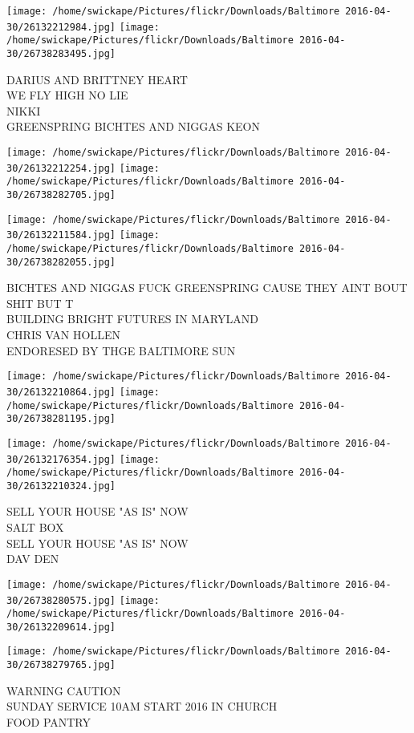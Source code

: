 \documentclass[10pt,letterpaper]{article}
\begin{document}
\texttt{[image: /home/swickape/Pictures/flickr/Downloads/Baltimore 2016-04-30/26132212984.jpg]}
\texttt{[image: /home/swickape/Pictures/flickr/Downloads/Baltimore 2016-04-30/26738283495.jpg]}

DARIUS AND BRITTNEY HEART\\
WE FLY HIGH NO LIE\\
NIKKI\\
GREENSPRING BICHTES AND NIGGAS KEON
\pagebreak

\texttt{[image: /home/swickape/Pictures/flickr/Downloads/Baltimore 2016-04-30/26132212254.jpg]}
\texttt{[image: /home/swickape/Pictures/flickr/Downloads/Baltimore 2016-04-30/26738282705.jpg]}

\texttt{[image: /home/swickape/Pictures/flickr/Downloads/Baltimore 2016-04-30/26132211584.jpg]}
\texttt{[image: /home/swickape/Pictures/flickr/Downloads/Baltimore 2016-04-30/26738282055.jpg]}

BICHTES AND NIGGAS FUCK GREENSPRING CAUSE THEY AINT BOUT SHIT BUT T\\
BUILDING BRIGHT FUTURES IN MARYLAND\\
CHRIS VAN HOLLEN\\
ENDORESED BY THGE BALTIMORE SUN
\pagebreak

\texttt{[image: /home/swickape/Pictures/flickr/Downloads/Baltimore 2016-04-30/26132210864.jpg]}
\texttt{[image: /home/swickape/Pictures/flickr/Downloads/Baltimore 2016-04-30/26738281195.jpg]}

\texttt{[image: /home/swickape/Pictures/flickr/Downloads/Baltimore 2016-04-30/26132176354.jpg]}
\texttt{[image: /home/swickape/Pictures/flickr/Downloads/Baltimore 2016-04-30/26132210324.jpg]}

SELL YOUR HOUSE "AS IS" NOW\\
SALT BOX\\
SELL YOUR HOUSE "AS IS" NOW\\
DAV DEN
\pagebreak

\texttt{[image: /home/swickape/Pictures/flickr/Downloads/Baltimore 2016-04-30/26738280575.jpg]}
\texttt{[image: /home/swickape/Pictures/flickr/Downloads/Baltimore 2016-04-30/26132209614.jpg]}

\texttt{[image: /home/swickape/Pictures/flickr/Downloads/Baltimore 2016-04-30/26738279765.jpg]}

WARNING CAUTION\\
SUNDAY SERVICE 10AM START 2016 IN CHURCH\\
FOOD PANTRY
\pagebreak
\end{document}
